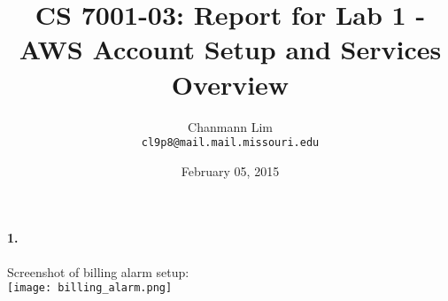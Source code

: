 \documentclass[a4paper]{article}
\begin{document}
\title{CS 7001-03: Report for Lab 1 - AWS Account Setup and Services Overview}
\author{Chanmann Lim\\ 
	\texttt{cl9p8@mail.mail.missouri.edu}}
\date{February 05, 2015}
\maketitle

\paragraph{1. } Screenshot of billing alarm setup: \\
\texttt{[image: billing\_alarm.png]} \\
\end{document}
